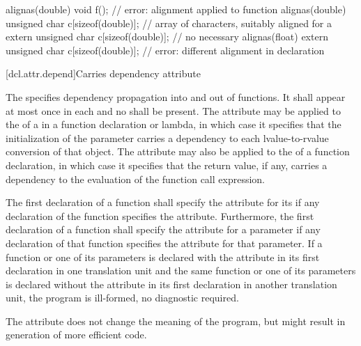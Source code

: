 \pnum
\begin{example}
\begin{codeblock}
alignas(double) void f();                           // error: alignment applied to function
alignas(double) unsigned char c[sizeof(double)];    // array of characters, suitably aligned for a 
extern unsigned char c[sizeof(double)];             // no  necessary
alignas(float)
  extern unsigned char c[sizeof(double)];           // error: different alignment in declaration
\end{codeblock}
\end{example}

[dcl.attr.depend]{Carries dependency attribute}%

\pnum
The   specifies
dependency propagation into and out of functions. It shall appear at most once
in each  and no
 shall be present. The attribute may be
applied to the  of a
 in a function declaration or lambda, in
which case it specifies that the initialization of the parameter carries a
dependency to each lvalue-to-rvalue
conversion of that object. The attribute may also be applied
to the  of a function declaration, in which case it
specifies that the return value, if any, carries a dependency to the evaluation
of the function call expression.

\pnum
The first declaration of a function shall specify the  attribute for its
 if any declaration of the function specifies the
 attribute. Furthermore, the first declaration of a function shall specify
the  attribute for a parameter if any declaration of that function
specifies the  attribute for that parameter. If a function or one of its
parameters is declared with the  attribute in its first declaration in one
translation unit and the same function or one of its parameters is declared without the
 attribute in its first declaration in another translation unit, the
program is ill-formed, no diagnostic required.

\pnum
\begin{note}
The  attribute does not change the meaning of the
program, but might result in generation of more efficient code.
\end{note}

